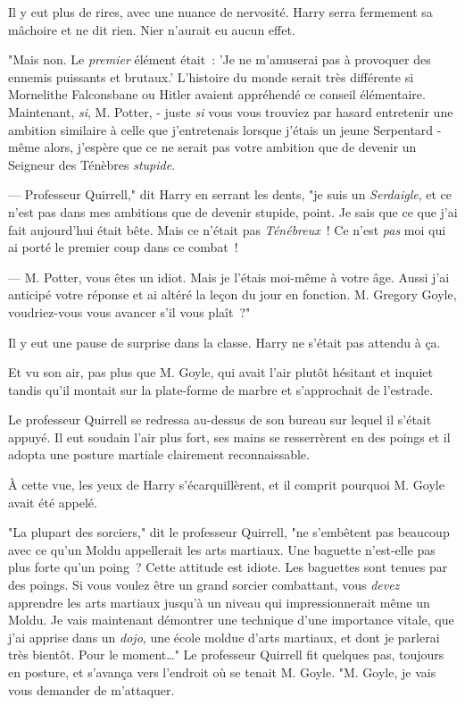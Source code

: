 Il y eut plus de rires, avec une nuance de nervosité. Harry serra fermement sa mâchoire et ne dit rien. Nier n'aurait eu aucun effet.

"Mais non. Le \emph{premier} élément était~: 'Je ne m'amuserai pas à provoquer des ennemis puissants et brutaux.' L'histoire du monde serait très différente si Mornelithe Falconsbane ou Hitler avaient appréhendé ce conseil élémentaire. Maintenant, \emph{si}, M. Potter, - juste \emph{si} vous vous trouviez par hasard entretenir une ambition similaire à celle que j'entretenais lorsque j'étais un jeune Serpentard - même alors, j'espère que ce ne serait pas votre ambition que de devenir un Seigneur des Ténèbres \emph{stupide}.

--- Professeur Quirrell," dit Harry en serrant les dents, "je suis un \emph{Serdaigle}, et ce n'est pas dans mes ambitions que de devenir stupide, point. Je sais que ce que j'ai fait aujourd'hui était bête. Mais ce n'était pas \emph{Ténébreux}~! Ce n'est \emph{pas} moi qui ai porté le premier coup dans ce combat~!

--- M. Potter, vous êtes un idiot. Mais je l'étais moi-même à votre âge. Aussi j'ai anticipé votre réponse et ai altéré la leçon du jour en fonction. M. Gregory Goyle, voudriez-vous vous avancer s'il vous plaît~?"

Il y eut une pause de surprise dans la classe. Harry ne s'était pas attendu à ça.

Et vu son air, pas plus que M. Goyle, qui avait l'air plutôt hésitant et inquiet tandis qu'il montait sur la plate-forme de marbre et s'approchait de l'estrade.

Le professeur Quirrell se redressa au-dessus de son bureau sur lequel il s'était appuyé. Il eut soudain l'air plus fort, ses mains se resserrèrent en des poings et il adopta une posture martiale clairement reconnaissable.

À cette vue, les yeux de Harry s'écarquillèrent, et il comprit pourquoi M. Goyle avait été appelé.

"La plupart des sorciers," dit le professeur Quirrell, "ne s'embêtent pas beaucoup avec ce qu'un Moldu appellerait les arts martiaux. Une baguette n'est-elle pas plus forte qu'un poing~? Cette attitude est idiote. Les baguettes sont tenues par des poings. Si vous voulez être un grand sorcier combattant, vous \emph{devez} apprendre les arts martiaux jusqu'à un niveau qui impressionnerait même un Moldu. Je vais maintenant démontrer une technique d'une importance vitale, que j'ai apprise dans un \emph{dojo}, une école moldue d'arts martiaux, et dont je parlerai très bientôt. Pour le moment…" Le professeur Quirrell fit quelques pas, toujours en posture, et s'avança vers l'endroit où se tenait M. Goyle. "M. Goyle, je vais vous demander de m'attaquer.

